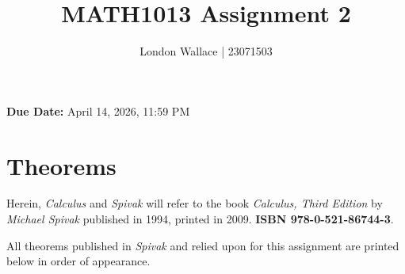 \documentclass{article}
\title{MATH1013 Assignment 2}
\author{London Wallace | 23071503}
\date{}
\begin{document}
\maketitle{}

\begin{flushleft}
	\textbf{Due Date:} April 14, 2026, 11:59 PM
\end{flushleft}

\section*{Theorems}
Herein, \textit{Calculus} and \textit{Spivak} will refer to the book \textit{Calculus, Third Edition} by
\textit{Michael Spivak} published in 1994, printed in 2009. \textbf{ISBN 978-0-521-86744-3}.

All theorems published in \textit{Spivak} and relied upon for this assignment are printed below in order of appearance.
\end{document}
